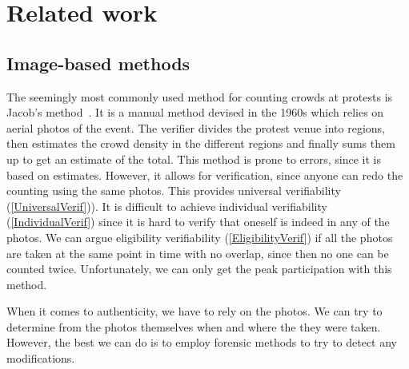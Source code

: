 \mode*
\section{Related work}

\subsection<presentation>{Image-based methods}

The seemingly most commonly used method for counting crowds at protests is 
Jacob's method~\cite[c.f.][]{%
  2016DemonstrationsInSeoul,%
  BBCHowToCountProtestNumbers,%
  HowWillWeKnowTrumpInauguralCrowdSize,%
  TheXManMarch,%
  TheCrowdNumbersGame,%
}.
It is a manual method devised in the 1960s which relies on aerial photos of the 
event.
The verifier divides the protest venue into regions, then estimates the crowd 
density in the different regions and finally sums them up to get an estimate of 
the total.
This method is prone to errors, since it is based on estimates.
However, it allows for verification, since anyone can redo the counting using 
the same photos.
This provides universal verifiability (\cref{UniversalVerif})).
It is difficult to achieve individual verifiability (\cref{IndividualVerif}) 
since it is hard to verify that oneself is indeed in any of the photos.
We can argue eligibility verifiability (\cref{EligibilityVerif}) if all the 
photos are taken at the same point in time with no overlap, since then no one 
can be counted twice.
Unfortunately, we can only get the peak participation with this method.

When it comes to authenticity, we have to rely on the photos.
We can try to determine from the photos themselves when and where the they were 
taken.
However, the best we can do is to employ forensic methods to try to detect any 
modifications.

